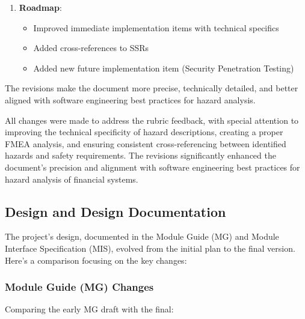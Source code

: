 \documentclass{article}
\begin{document}
\begin{enumerate}
  \item \textbf{Roadmap}:
  \begin{itemize}
    \item Improved immediate implementation items with technical specifics
    \item Added cross-references to SSRs
    \item Added new future implementation item (Security Penetration Testing)
  \end{itemize}
\end{enumerate}

\vspace{1em}
The revisions make the document more precise, technically detailed, and better aligned with software engineering best practices for hazard analysis.


All changes were made to address the rubric feedback, with special attention to improving the technical specificity of hazard descriptions, creating a proper FMEA analysis, and ensuring consistent cross-referencing between identified hazards and safety requirements. The revisions significantly enhanced the document's precision and alignment with software engineering best practices for hazard analysis of financial systems.

\subsection{Design and Design Documentation}

The project's design, documented in the Module Guide (MG) and Module Interface Specification (MIS), evolved from the initial plan to the final version. Here’s a comparison focusing on the key changes:

\subsubsection{Module Guide (MG) Changes}

Comparing the early MG draft with the final:
\end{document}
